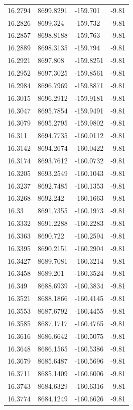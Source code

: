 \begin{table}[H]
\begin{tabular}{llll}
16.2794 & 8699.8291 & -159.701 & -9.81 \\
16.2826 & 8699.324 & -159.732 & -9.81 \\
16.2857 & 8698.8188 & -159.763 & -9.81 \\
16.2889 & 8698.3135 & -159.794 & -9.81 \\
16.2921 & 8697.808 & -159.8251 & -9.81 \\
16.2952 & 8697.3025 & -159.8561 & -9.81 \\
16.2984 & 8696.7969 & -159.8871 & -9.81 \\
16.3015 & 8696.2912 & -159.9181 & -9.81 \\
16.3047 & 8695.7854 & -159.9491 & -9.81 \\
16.3079 & 8695.2795 & -159.9802 & -9.81 \\
16.311 & 8694.7735 & -160.0112 & -9.81 \\
16.3142 & 8694.2674 & -160.0422 & -9.81 \\
16.3174 & 8693.7612 & -160.0732 & -9.81 \\
16.3205 & 8693.2549 & -160.1043 & -9.81 \\
16.3237 & 8692.7485 & -160.1353 & -9.81 \\
16.3268 & 8692.242 & -160.1663 & -9.81 \\
16.33 & 8691.7355 & -160.1973 & -9.81 \\
16.3332 & 8691.2288 & -160.2283 & -9.81 \\
16.3363 & 8690.722 & -160.2594 & -9.81 \\
16.3395 & 8690.2151 & -160.2904 & -9.81 \\
16.3427 & 8689.7081 & -160.3214 & -9.81 \\
16.3458 & 8689.201 & -160.3524 & -9.81 \\
16.349 & 8688.6939 & -160.3834 & -9.81 \\
16.3521 & 8688.1866 & -160.4145 & -9.81 \\
16.3553 & 8687.6792 & -160.4455 & -9.81 \\
16.3585 & 8687.1717 & -160.4765 & -9.81 \\
16.3616 & 8686.6642 & -160.5075 & -9.81 \\
16.3648 & 8686.1565 & -160.5386 & -9.81 \\
16.3679 & 8685.6487 & -160.5696 & -9.81 \\
16.3711 & 8685.1409 & -160.6006 & -9.81 \\
16.3743 & 8684.6329 & -160.6316 & -9.81 \\
16.3774 & 8684.1249 & -160.6626 & -9.81 \\

\end{tabular}
\end{table}
